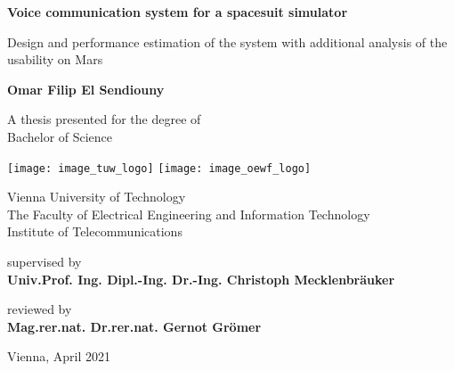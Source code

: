\begin{titlepage}
	\begin{center}
		\vspace*{1cm}
		
		\LARGE
		\textbf{Voice communication system for a spacesuit simulator}
		
		\vspace{0.5cm}	%
		\Large
		Design and performance estimation of the system with additional analysis of the usability on Mars 
		
		\vspace{1.5cm}
		\normalsize
		\textbf{Omar Filip El Sendiouny}
		
		\vfill
		
		\small
		A thesis presented for the degree of\\
		Bachelor of Science
		
		\vspace{0.8cm}
		\texttt{[image: image\_tuw\_logo]} \hspace{1.8cm}
		\texttt{[image: image\_oewf\_logo]}
		
		\vspace{0.8cm}
		\small
		Vienna University of Technology\\
		The Faculty of Electrical Engineering and Information Technology\\
		Institute of Telecommunications
		
		\vspace{0.8cm}
		\normalsize
		supervised by\\
		\textbf{Univ.Prof. Ing. Dipl.-Ing. Dr.-Ing. Christoph Mecklenbräuker}
		
		\vspace{0.8cm}
		reviewed by\\
		\textbf{Mag.rer.nat. Dr.rer.nat. Gernot Grömer}
		
		\small
		\vspace{2.4cm}
		Vienna, April 2021
		
	\end{center}
\end{titlepage}